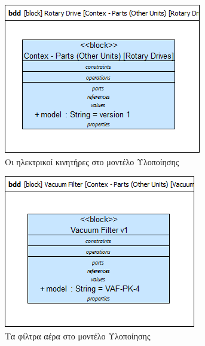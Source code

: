 \documentclass[a4paper,12pt,twoside]{report}
\begin{document}
{\begin{appendices}
				\begin{figure}[hp]
					\centering
					\includegraphics[scale=0.50]{DesignModel_Contex-Parts(OtherUnits)[RotaryDrives].png}
					\caption{Οι ηλεκτρικοί κινητήρες στο μοντέλο Υλοποίησης}
					\label{φωτ:Οι ηλεκτρικοί κινητήρες στο μοντέλο Υλοποίησης}
				\end{figure}
				
				\begin{figure}[hp]
					\centering
					\includegraphics[scale=0.50]{DesignModel_Contex-Parts(OtherUnits)[VacuumFilter].png}
					\caption{Τα φίλτρα αέρα στο μοντέλο Υλοποίησης}
					\label{φωτ:Τα φίλτρα αέρα στο μοντέλο Υλοποίησης}
				\end{figure}
				

\end{appendices}}
\end{document}

